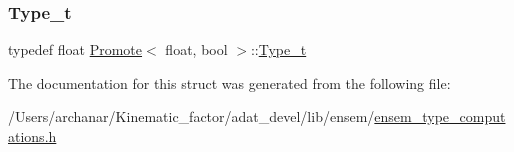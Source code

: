 \subsubsection{\texorpdfstring{Type\_t}{Type\_t}\hspace{0.1cm}{\footnotesize\ttfamily [2/2]}}
{\footnotesize\ttfamily typedef float \mbox{\hyperlink{structPromote}{Promote}}$<$ float, bool $>$\+::\mbox{\hyperlink{structPromote_3_01float_00_01bool_01_4_a4a81b15631e324d8d2dade1c48484b63}{Type\+\_\+t}}}



The documentation for this struct was generated from the following file\+:\begin{DoxyCompactItemize}
\item 
/\+Users/archanar/\+Kinematic\+\_\+factor/adat\+\_\+devel/lib/ensem/\mbox{\hyperlink{lib_2ensem_2ensem__type__computations_8h}{ensem\+\_\+type\+\_\+computations.\+h}}\end{DoxyCompactItemize}
